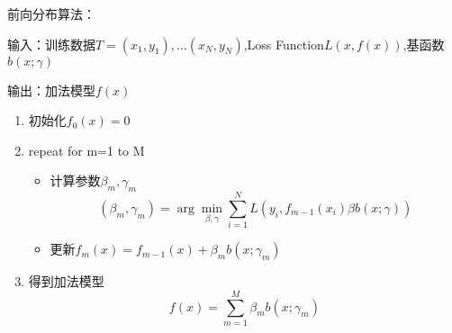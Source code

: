 	前向分布算法：

	输入：训练数据$T={(x_1,y_1),...(x_N,y_N)}$,Loss Function$L(x,f(x))$,基函数$b(x;\gamma)$

	输出：加法模型$f(x)$

	\begin{enumerate}		
		\item 初始化$f_0(x)=0$
		\item repeat for m=1 to M
			\begin{itemize}
				\item 计算参数$\beta_m,\gamma_m$
				\begin{equation}
					(\beta_m,\gamma_m)=\arg\min_{\beta,\gamma} \sum_{i=1}^{N}L(y_i,f_{m-1}(x_i)\beta b(x;\gamma))
				\end{equation}
				\item 更新$f_m(x)=f_{m-1}(x)+\beta_m b(x;\gamma_m)$
			\end{itemize}
		\item 得到加法模型
				\begin{equation}
					f(x)=\sum_{m=1}^{M} \beta_m b(x;\gamma_m)
				\end{equation}
	\end{enumerate}
	
	